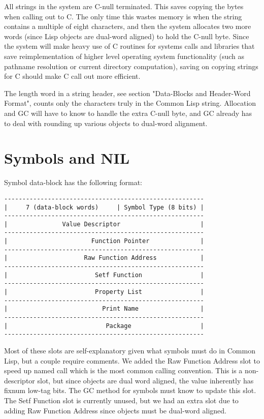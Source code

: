 All strings in the system are C-null terminated.  This saves copying the bytes
when calling out to C.  The only time this wastes memory is when the string
contains a multiple of eight characters, and then the system allocates two more
words (since Lisp objects are dual-word aligned) to hold the C-null byte.
Since the system will make heavy use of C routines for systems calls and
libraries that save reimplementation of higher level operating system
functionality (such as pathname resolution or current directory computation),
saving on copying strings for C should make C call out more efficient.

The length word in a string header, see section "Data-Blocks and Header-Word
Format", counts only the characters truly in the Common Lisp string.
Allocation and GC will have to know to handle the extra C-null byte, and GC
already has to deal with rounding up various objects to dual-word alignment.



\section{Symbols and NIL}

Symbol data-block has the following format:
\begin{verbatim}
-------------------------------------------------------
|     7 (data-block words)     | Symbol Type (8 bits) |
-------------------------------------------------------
|               Value Descriptor                      |
-------------------------------------------------------
|                       Function Pointer              |
-------------------------------------------------------
|                     Raw Function Address            |
-------------------------------------------------------
|                        Setf Function                |
-------------------------------------------------------
|                        Property List                |
-------------------------------------------------------
|                          Print Name                 |
-------------------------------------------------------
|                           Package                   |
-------------------------------------------------------
\end{verbatim}

Most of these slots are self-explanatory given what symbols must do in Common
Lisp, but a couple require comments.  We added the Raw Function Address slot to
speed up named call which is the most common calling convention.  This is a
non-descriptor slot, but since objects are dual word aligned, the value
inherently has fixnum low-tag bits.  The GC method for symbols must know to
update this slot.  The Setf Function slot is currently unused, but we had an
extra slot due to adding Raw Function Address since objects must be dual-word
aligned.

